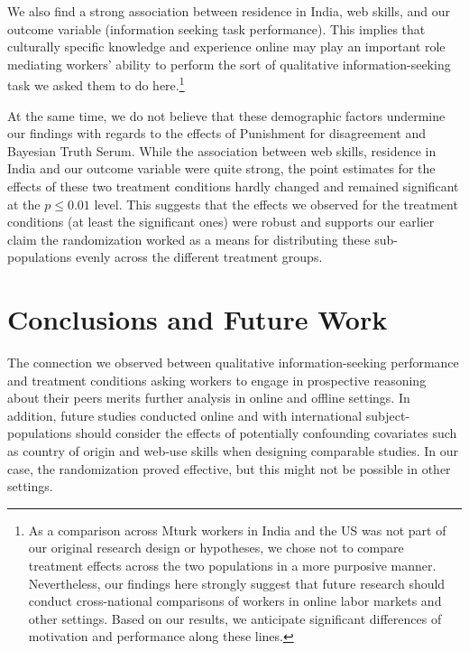 \documentclass{cscw2010}
\begin{document}
We also find a strong association between residence in
India, web skills, and our outcome variable (information seeking task
performance). This implies that culturally specific knowledge and
experience online may play an important role mediating workers'
ability to perform the sort of qualitative information-seeking task we
asked them to do here.\footnote{As a comparison across Mturk workers
  in India and the US was not part of our original research design
  or hypotheses, we chose not to compare treatment effects across the
  two populations in a more purposive manner. Nevertheless, our
  findings here strongly suggest that future research should conduct
  cross-national comparisons of workers in online labor markets and
  other settings. Based on our results, we anticipate significant
  differences of motivation and performance along these
  lines.\cite{antin2011desirability}}

At the same time, we do not believe that these demographic factors
undermine our findings with regards to the effects of Punishment for
disagreement and Bayesian Truth Serum. While the association between
web skills, residence in India and our outcome variable were quite
strong, the point estimates for the effects of these two treatment
conditions hardly changed and remained significant at the $p\leq 0.01$
level. This suggests that the effects we observed for the treatment
conditions (at least the significant ones) were robust and supports
our earlier claim the randomization worked as a means for distributing
these sub-populations evenly across the different treatment groups.

\section{Conclusions and Future Work}

The connection we observed between qualitative information-seeking
performance and treatment conditions asking workers to engage in
prospective reasoning about their peers merits further analysis in
online and offline settings. In addition, future studies conducted
online and with international subject-populations should consider the
effects of potentially confounding covariates such as country of
origin and web-use skills when designing comparable studies. In our
case, the randomization proved effective, but this might not be
possible in other settings. 
\end{document}
